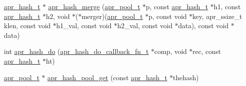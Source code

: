 \begin{DoxyCompactItemize}
\hyperlink{group__apr__hash_ga72ec09b8bde6d874c36bd49df915fff6}{apr\+\_\+hash\+\_\+t} $\ast$ \hyperlink{group__apr__hash_gad353e2c54964c243bd376572af4992ea}{apr\+\_\+hash\+\_\+merge} (\hyperlink{group__apr__pools_gaf137f28edcf9a086cd6bc36c20d7cdfb}{apr\+\_\+pool\+\_\+t} $\ast$p, const \hyperlink{group__apr__hash_ga72ec09b8bde6d874c36bd49df915fff6}{apr\+\_\+hash\+\_\+t} $\ast$h1, const \hyperlink{group__apr__hash_ga72ec09b8bde6d874c36bd49df915fff6}{apr\+\_\+hash\+\_\+t} $\ast$h2, void $\ast$($\ast$merger)(\hyperlink{group__apr__pools_gaf137f28edcf9a086cd6bc36c20d7cdfb}{apr\+\_\+pool\+\_\+t} $\ast$p,                                                                                                                                                                                                           const void $\ast$key,                                                                                                                                                                                                           apr\+\_\+ssize\+\_\+t klen,                                                                                                                                                                                                           const void $\ast$h1\+\_\+val,                                                                                                                                                                                                           const void $\ast$h2\+\_\+val,                                                                                                                                                                                                           const void $\ast$data), const void $\ast$data)
\item 
int \hyperlink{group__apr__hash_ga3f3bac64e281d9e7eb9fed6101031394}{apr\+\_\+hash\+\_\+do} (\hyperlink{group__apr__hash_ga9352d7eed661ad06b7635314530a3227}{apr\+\_\+hash\+\_\+do\+\_\+callback\+\_\+fn\+\_\+t} $\ast$comp, void $\ast$rec, const \hyperlink{group__apr__hash_ga72ec09b8bde6d874c36bd49df915fff6}{apr\+\_\+hash\+\_\+t} $\ast$ht)
\item 
\hyperlink{group__apr__pools_gaf137f28edcf9a086cd6bc36c20d7cdfb}{apr\+\_\+pool\+\_\+t} $\ast$ \hyperlink{group__apr__hash_ga6c170fee4d679928d381cd61c559c105}{apr\+\_\+hash\+\_\+pool\+\_\+get} (const \hyperlink{group__apr__hash_ga72ec09b8bde6d874c36bd49df915fff6}{apr\+\_\+hash\+\_\+t} $\ast$thehash)
\end{DoxyCompactItemize}


